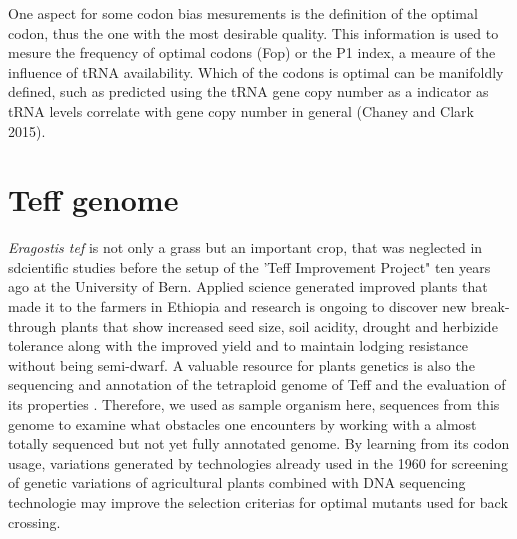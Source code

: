 One aspect for some codon bias mesurements is the definition of the optimal codon, thus the one with the most desirable quality. This information is used to mesure the frequency of optimal codons (Fop) or the P1 index, a meaure of the influence of tRNA availability. Which of the codons is optimal can be manifoldly defined, such as predicted using the tRNA gene copy number as a indicator as tRNA levels correlate with gene copy number in general \cite{Chaney2015}(Chaney and Clark 2015).

\section{Teff genome}
\textit{Eragostis tef} is not only a grass but an important crop, that was neglected in sdcientific studies before the setup of the 'Teff Improvement Project" ten years ago at the University of Bern. Applied science generated improved plants that made it to the farmers in Ethiopia and research is ongoing to discover new break-through plants that show increased seed size, soil acidity, drought and herbizide tolerance along with the improved yield and to maintain lodging resistance without being semi-dwarf. A valuable resource for plants genetics is also the sequencing and annotation of the tetraploid genome of Teff and the evaluation of its properties \cite{cannarozzi2014genome}. Therefore, we used as sample organism here, sequences from this genome to examine what obstacles one encounters by working with a almost totally sequenced but not yet fully annotated genome. By learning from its codon usage, variations generated by technologies already used in the 1960 for screening of genetic variations of agricultural plants combined with DNA sequencing technologie may improve the selection criterias for optimal mutants used for back crossing. 